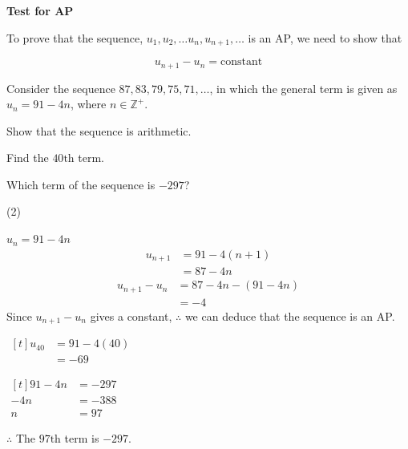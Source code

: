 \documentclass[11pt,a4paper]{book}
\newcommand{\Z}{\mathbb{Z}}
\begin{document}
\begin{tcolorbox}[colback=blue!5, colframe=black,boxrule=.4pt, sharpish corners]

\textbf{Test for AP}

\medskip{}

To prove that the sequence, $u_{1},u_{2},\ldots u_{n},u_{n+1},\ldots$ is an AP, we need to show that

\[
u_{n+1}-u_{n}=\text{constant}
\]
\end{tcolorbox}

\begin{example}

Consider the sequence $87,83,79,75,71,\ldots$, in which the general term is given as $u_{n}=91-4n$, where $n\in\Z^{+}$.

\begin{tasks}[label=(\alph*),label-width=3.5ex]
\task  Show that the sequence is arithmetic.

\task  Find the $40\text{th}$ term.

\task  Which term of the sequence is $-297$?

\end{tasks}

\Solution

\begin{tasks}[label=(\alph*),label-width=3.5ex] (2)

\task*  $u_{n}=91-4n$
\begin{align*}
u_{n+1} & =91-4\left(n+1\right)\\
 & =87-4n
\end{align*}
\begin{align*}
u_{n+1}-u_{n} & =87-4n-\left(91-4n\right)\\
 & =-4
\end{align*}
Since $u_{n+1}-u_{n}$ gives a constant, $\therefore$ we can deduce that the sequence is an AP.

\task
$
\begin{aligned}[t]
u_{40} & =91-4\left(40\right)\\
 & =-69
\end{aligned}
$

\task
$
\begin{aligned}[t]
91-4n & =-297\\
-4n & =-388\\
n & =97
\end{aligned}
$

$\therefore$ The $97\text{th}$ term is $-297$.

\end{tasks}

\end{example}
\end{document}
